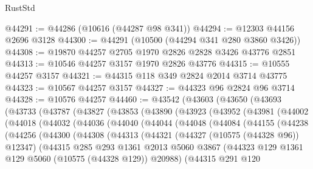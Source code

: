 \begin{lexlean}{RustStd}
\begin{coremodule}
@44291 := @44286 (@10616 (@44287 @98 @341))
@44294 := @12303 @44156 @2696 @3128
@44300 := @44291 (@10500 (@44294 @341 @280 @3860 @3426))
@44308 := @19870 @44257 @2705 @1970 @2826 @2828 @3426 @43776 @2851
@44313 := @10546 @44257 @3157 @1970 @2826 @43776
@44315 := @10555 @44257 @3157
@44321 := @44315 @118 @349 @2824 @2014 @3714 @43775
@44323 := @10567 @44257 @3157
@44327 := @44323 @96 @2824 @96 @3714
@44328 := @10576 @44257
@44460 := @43542
    (@43603
      (@43650
        (@43693
          (@43733
            (@43787
              (@43827
                (@43853
                  (@43890
                    (@43923
                      (@43952
                        (@43981
                          (@44002
                            (@44018
                              (@44032
                                (@44036
                                  (@44040
                                    (@44044
                                      (@44048
                                        (@44084
                                          (@44155
                                            (@44238
                                              (@44256
                                                (@44300
                                                  (@44308
                                                    (@44313
                                                      (@44321
                                                        (@44327 (@10575 (@44328 @96)) @12347)
                                                        (@44315
                                                          @285
                                                          @293
                                                          @1361
                                                          @2013
                                                          @5060
                                                          @3867
                                                          (@44323
                                                            @129
                                                            @1361
                                                            @129
                                                            @5060
                                                            (@10575 (@44328 @129))
                                                            @20988)
                                                          (@44315
                                                            @291
                                                            @120

\end{coremodule}
\end{lexlean}
